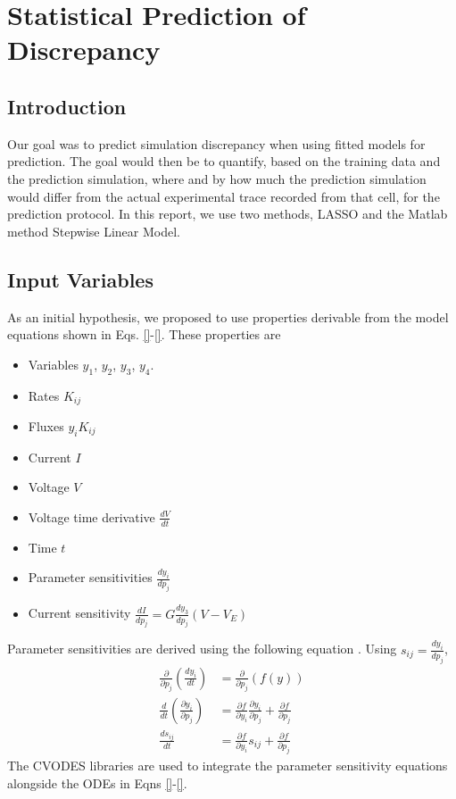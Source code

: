 \documentclass[11pt,a4paper,oneside]{article}
\begin{document}
{\section{Statistical Prediction of Discrepancy}

\subsection{Introduction}

Our goal was to predict simulation discrepancy when using fitted models for prediction. The goal would then be to quantify, based on the training data and the prediction simulation, where and by how much the prediction simulation would differ from the actual experimental trace recorded from that cell, for the prediction protocol. In this report, we use two methods, LASSO and the Matlab method Stepwise Linear Model.

\subsection{Input Variables}

As an initial hypothesis, we proposed to use properties derivable from the model equations shown in Eqs. \eqref{}-\eqref{}. These properties are
\begin{itemize}
\item Variables $y_1$, $y_2$, $y_3$, $y_4$.
\item Rates $K_{ij}$
\item Fluxes $y_i K_{ij}$
\item Current $I$
\item Voltage $V$
\item Voltage time derivative $\frac{dV}{dt}$
\item Time $t$
\item Parameter sensitivities $\frac{dy_i}{dp_j}$
\item Current sensitivity $\frac{dI}{dp_j} = G \frac{dy_3}{dp_j} (V-V_E) $
\end{itemize}

Parameter sensitivities are derived using the following equation \cite{}. Using $s_{ij} = \frac{dy_i}{dp_j}$,
\begin{align}
	\frac{\partial}{\partial p_j} ( \frac{dy_i}{dt} ) & = \frac{\partial}{\partial p_j} (f( y ) ) \\
	\frac{d}{dt}(\frac{\partial y_i}{\partial p_j})   & = \frac{\partial f}{ \partial y_i}\frac{\partial y_i}{ \partial p_j} + \frac{\partial f}{ \partial p_j} \\
	\frac{d s_{ij}}{dt} & = \frac{\partial f}{ \partial y_i} s_{ij} + \frac{\partial f}{ \partial p_j}
\end{align}
The CVODES libraries are used to integrate the parameter sensitivity equations alongside the ODEs in Eqns \eqref{}-\eqref{}.

}
\end{document}
